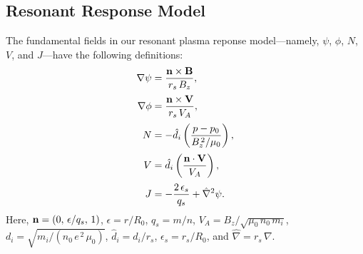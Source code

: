 \documentclass[12pt,prb,aps]{revtex4-1}
\begin{document}
\subsection{Resonant Response Model}\label{resonant}
The fundamental fields in our resonant plasma reponse model---namely, $\psi$, $\phi$, $N$, $V$, and $J$---have the following
definitions:
\begin{align}\label{e10}
\nabla\psi &= \frac{{\bf n}\times{\bf B}} {r_s\,B_z},\\[0.5ex]
\nabla\phi &= \frac{{\bf n}\times {\bf V}}{r_s\,V_A},\\[0.5ex]
N &=-\hat{d}_i\left(\frac{p-p_0}{B_z^{\,2}/\mu_0}\right),\\[0.5ex]
V &= \hat{d}_i\left(\frac{{\bf n}\cdot {\bf V}}{V_A}\right),\label{e13}\\[0.5ex]
J&=-\frac{2\,\epsilon_s}{q_s}+\hat{\nabla}^2\psi.
\end{align}
Here,   ${\bf n} = (0,\,\epsilon/q_s,\,1)$, $\epsilon = r/R_0$, $q_s=m/n$, 
$V_A =B_z/\sqrt{\mu_0\,n_0\,m_i}$, 
$d_i = \sqrt{m_i/(n_0\,e^{\,2}\,\mu_0)}$,  $\hat{d}_i=d_i/r_s$, 
$\epsilon_s=r_s/R_0$, and $\hat{\nabla} = r_s\,\nabla$. 
\end{document}
